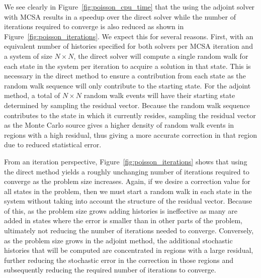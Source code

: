 We see clearly in Figure~\ref{fig:poisson_cpu_time} that the using the
adjoint solver with MCSA results in a speedup over the direct solver
while the number of iterations required to converge is also reduced as
shown in Figure~\ref{fig:poisson_iterations}. We expect this for
several reasons. First, with an equivalent number of histories
specified for both solvers per MCSA iteration and a system of size $N
\times N$, the direct solver will compute a single random walk for
each state in the system per iteration to acquire a solution in that
state. This is necessary in the direct method to ensure a contribution
from each state as the random walk sequence will only contribute to
the starting state. For the adjoint method, a total of $N \times N$
random walk events will have their starting state determined by
sampling the residual vector. Because the random walk sequence
contributes to the state in which it currently resides, sampling the
residual vector as the Monte Carlo source gives a higher density of
random walk events in regions with a high residual, thus giving a more
accurate correction in that region due to reduced statistical
error. 

From an iteration perspective, Figure~\ref{fig:poisson_iterations}
shows that using the direct method yields a roughly unchanging number
of iterations required to converge as the problem size
increases. Again, if we desire a correction value for all states in
the problem, then we must start a random walk in each state in the
system without taking into account the structure of the residual
vector. Because of this, as the problem size grows adding histories is
ineffective as many are added in states where the error is smaller
than in other parts of the problem, ultimately not reducing the number
of iterations needed to converge. Conversely, as the problem size
grows in the adjoint method, the additional stochastic histories that
will be computed are concentrated in regions with a large residual,
further reducing the stochastic error in the correction in those
regions and subsequently reducing the required number of iterations to
converge.

